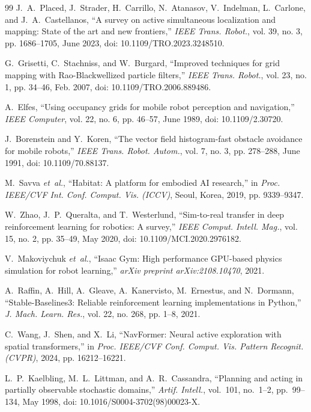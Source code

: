 \documentclass[conference]{IEEEtran}
\begin{document}
\begin{thebibliography}{99}
J.~A.~Placed, J.~Strader, H.~Carrillo, N.~Atanasov, V.~Indelman, L.~Carlone, and J.~A.~Castellanos, ``A survey on active simultaneous localization and mapping: State of the art and new frontiers,'' \textit{IEEE Trans. Robot.}, vol. 39, no. 3, pp. 1686--1705, June 2023, doi: 10.1109/TRO.2023.3248510.

G.~Grisetti, C.~Stachniss, and W.~Burgard, ``Improved techniques for grid mapping with Rao-Blackwellized particle filters,'' \textit{IEEE Trans. Robot.}, vol. 23, no. 1, pp. 34--46, Feb. 2007, doi: 10.1109/TRO.2006.889486.

A.~Elfes, ``Using occupancy grids for mobile robot perception and navigation,'' \textit{IEEE Computer}, vol. 22, no. 6, pp. 46--57, June 1989, doi: 10.1109/2.30720.

J.~Borenstein and Y.~Koren, ``The vector field histogram-fast obstacle avoidance for mobile robots,'' \textit{IEEE Trans. Robot. Autom.}, vol. 7, no. 3, pp. 278--288, June 1991, doi: 10.1109/70.88137.

M.~Savva \textit{et~al.}, ``Habitat: A platform for embodied AI research,'' in \textit{Proc. IEEE/CVF Int. Conf. Comput. Vis. (ICCV)}, Seoul, Korea, 2019, pp. 9339--9347.

W.~Zhao, J.~P.~Queralta, and T.~Westerlund, ``Sim-to-real transfer in deep reinforcement learning for robotics: A survey,'' \textit{IEEE Comput. Intell. Mag.}, vol. 15, no. 2, pp. 35--49, May 2020, doi: 10.1109/MCI.2020.2976182.

V.~Makoviychuk \textit{et~al.}, ``Isaac Gym: High performance GPU-based physics simulation for robot learning,'' \textit{arXiv preprint arXiv:2108.10470}, 2021.

A.~Raffin, A.~Hill, A.~Gleave, A.~Kanervisto, M.~Ernestus, and N.~Dormann, ``Stable-Baselines3: Reliable reinforcement learning implementations in Python,'' \textit{J. Mach. Learn. Res.}, vol. 22, no. 268, pp. 1--8, 2021.

C.~Wang, J.~Shen, and X.~Li, ``NavFormer: Neural active exploration with spatial transformers,'' in \textit{Proc. IEEE/CVF Conf. Comput. Vis. Pattern Recognit. (CVPR)}, 2024, pp. 16212--16221.

L.~P.~Kaelbling, M.~L.~Littman, and A.~R.~Cassandra, ``Planning and acting in partially observable stochastic domains,'' \textit{Artif. Intell.}, vol.~101, no.~1--2, pp.~99--134, May 1998, doi: 10.1016/S0004-3702(98)00023-X.


\end{thebibliography}
\end{document}
